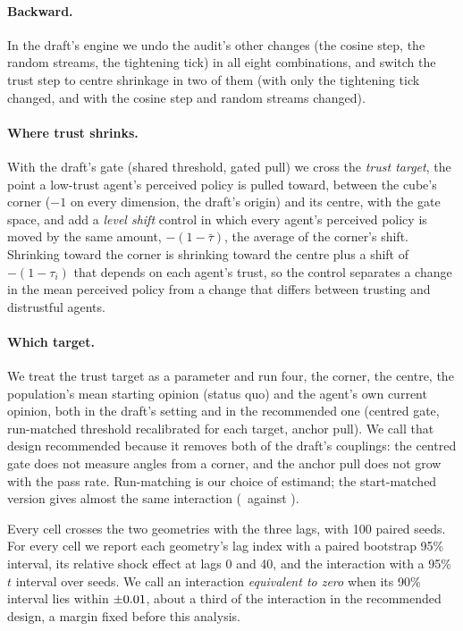 \documentclass[11pt]{article}
\begin{document}
\paragraph{Backward.} In the draft's engine we undo the audit's other changes (the cosine step, the random streams, the tightening tick) in all eight combinations, and switch the trust step to centre shrinkage in two of them (with only the tightening tick changed, and with the cosine step and random streams changed).
\paragraph{Where trust shrinks.} With the draft's gate (shared threshold, gated pull) we cross the \emph{trust target}, the point a low-trust agent's perceived policy is pulled toward, between the cube's corner ($-1$ on every dimension, the draft's origin) and its centre, with the gate space, and add a \emph{level shift} control in which every agent's perceived policy is moved by the same amount, $-(1-\bar\tau)$, the average of the corner's shift.
Shrinking toward the corner is shrinking toward the centre plus a shift of $-(1-\tau_i)$ that depends on each agent's trust, so the control separates a change in the mean perceived policy from a change that differs between trusting and distrustful agents.
\paragraph{Which target.} We treat the trust target as a parameter and run four, the corner, the centre, the population's mean starting opinion (status quo) and the agent's own current opinion, both in the draft's setting and in the recommended one (centred gate, run-matched threshold recalibrated for each target, anchor pull).
We call that design recommended because it removes both of the draft's couplings: the centred gate does not measure angles from a corner, and the anchor pull does not grow with the pass rate.
Run-matching is our choice of estimand; the start-matched version gives almost the same interaction (\VFCentredMatchedAnchorInter\ against \VFCentredRunAnchorInter).

Every cell crosses the two geometries with the three lags, with 100 paired seeds.
For every cell we report each geometry's lag index with a paired bootstrap 95\% interval, its relative shock effect at lags 0 and 40, and the interaction with a 95\% $t$ interval over seeds.
We call an interaction \emph{equivalent to zero} when its 90\% interval lies within $\pm0.01$, about a third of the interaction in the recommended design, a margin fixed before this analysis.
\end{document}
